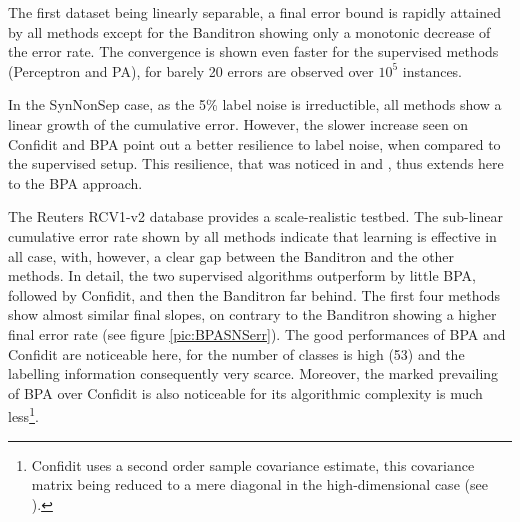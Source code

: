 \documentclass[preprint,12pt,authoryear]{elsarticle}
\begin{document}
The first dataset being linearly separable, a final error bound is rapidly attained by all methods except for the Banditron showing only a monotonic decrease of the error rate. The convergence is shown even faster for the supervised methods (Perceptron and PA), for barely 20 errors are observed over $10^5$ instances. 


In the SynNonSep case, as the  5\% label noise is irreductible, all methods show a linear growth of the cumulative error. However, the slower increase seen on Confidit and BPA  point out a better resilience to label noise, when compared to the supervised setup. This resilience, that was noticed in \cite{crammer2013multiclass} and \cite{ngo2013upper}, thus extends here to the BPA approach.


The Reuters RCV1-v2 database provides a  scale-realistic testbed.
The sub-linear cumulative error rate  shown by all methods indicate that learning is effective in all case, with, however, a clear gap between the Banditron and the other methods. In detail, the two supervised algorithms outperform by little BPA, followed by Confidit, and then the Banditron far behind. The first four methods show almost similar final slopes, on contrary to the Banditron showing a higher final error rate (see figure \ref{pic:BPASNSerr}). The good performances of BPA and Confidit are noticeable here, for the number of classes is high (53) and the labelling information consequently very scarce. 
Moreover, the marked prevailing of BPA over Confidit is also noticeable for its algorithmic complexity is much less\footnote{Confidit uses a second order sample covariance estimate, this covariance matrix being reduced  to a mere diagonal in the high-dimensional case (see  \cite{crammer2013multiclass}).}. 
\end{document}
